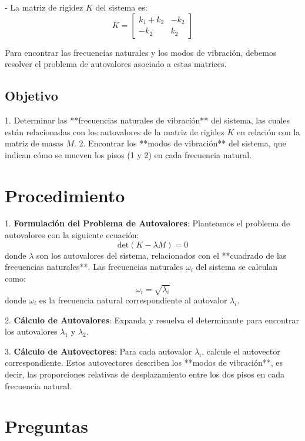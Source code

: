 \documentclass{article}
\begin{document}
- La matriz de rigidez \( K \) del sistema es:
  \[
  K = \begin{bmatrix} k_1 + k_2 & -k_2 \\ -k_2 & k_2 \end{bmatrix}
  \]

Para encontrar las frecuencias naturales y los modos de vibración, debemos resolver el problema de autovalores asociado a estas matrices.

\subsection*{Objetivo}

1. Determinar las **frecuencias naturales de vibración** del sistema, las cuales están relacionadas con los autovalores de la matriz de rigidez \( K \) en relación con la matriz de masas \( M \).
2. Encontrar los **modos de vibración** del sistema, que indican cómo se mueven los pisos (1 y 2) en cada frecuencia natural.

\section*{Procedimiento}

1. \textbf{Formulación del Problema de Autovalores}: Planteamos el problema de autovalores con la siguiente ecuación:
   \[
   \text{det}(K - \lambda M) = 0
   \]
   donde \(\lambda\) son los autovalores del sistema, relacionados con el **cuadrado de las frecuencias naturales**. Las frecuencias naturales \(\omega_i\) del sistema se calculan como:
   \[
   \omega_i = \sqrt{\lambda_i}
   \]
   donde \(\omega_i\) es la frecuencia natural correspondiente al autovalor \(\lambda_i\).

2. \textbf{Cálculo de Autovalores}:
   Expanda y resuelva el determinante para encontrar los autovalores \(\lambda_1\) y \(\lambda_2\).

3. \textbf{Cálculo de Autovectores}:
   Para cada autovalor \(\lambda_i\), calcule el autovector correspondiente. Estos autovectores describen los **modos de vibración**, es decir, las proporciones relativas de desplazamiento entre los dos pisos en cada frecuencia natural.

\section*{Preguntas}
\end{document}
